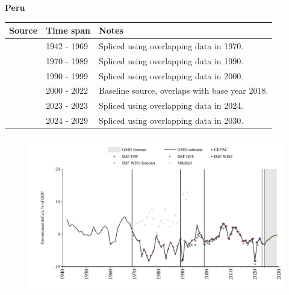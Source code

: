 \documentclass[12pt,a4paper,landscape]{article}
\begin{document}
\begin{adjustbox}{max totalsize={\paperwidth}{\paperheight},center}
\begin{minipage}[t][\textheight][t]{\textwidth}
\vspace*{0.5cm}
{}
\begin{center}
{\Large\bfseries Peru}
\end{center}
\vspace{0.5cm}
\begin{table}[H]
\centering
\small
\begin{tabular}{|l|l|l|}
\hline
\textbf{Source} & \textbf{Time span} & \textbf{Notes} \\
\hline
\rowcolor{white}\cite{Mitchell}& 1942 - 1969 &Spliced using overlapping data in 1970.\\
\rowcolor{lightgray}\cite{IMF_FPP}& 1970 - 1989 &Spliced using overlapping data in 1990.\\
\rowcolor{white}\cite{IMF_GFS}& 1990 - 1999 &Spliced using overlapping data in 2000.\\
\rowcolor{lightgray}\cite{IMF_WEO}& 2000 - 2022 &Baseline source, overlaps with base year 2018.\\
\rowcolor{white}\cite{IMF_FPP}& 2023 - 2023 &Spliced using overlapping data in 2024.\\
\rowcolor{lightgray}\cite{IMF_WEO_forecast}& 2024 - 2029 &Spliced using overlapping data in 2030.\\
\hline
\end{tabular}
\end{table}
\begin{figure}[H]
\centering
\includegraphics[width=\textwidth,height=0.6\textheight,keepaspectratio]{graphs/PER_govdef_GDP.pdf}
\end{figure}
\end{minipage}
\end{adjustbox}
\end{document}
